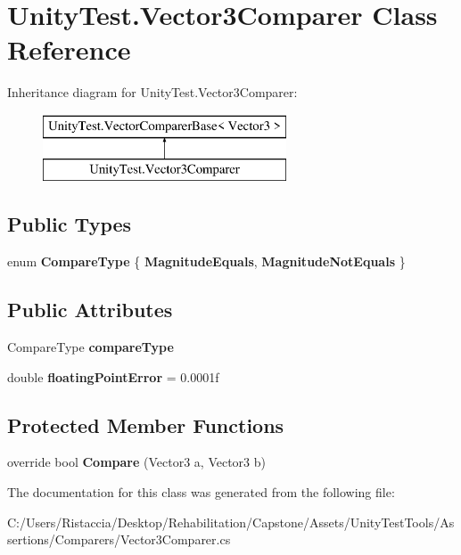 \hypertarget{class_unity_test_1_1_vector3_comparer}{}\section{Unity\+Test.\+Vector3\+Comparer Class Reference}
\label{class_unity_test_1_1_vector3_comparer}
Inheritance diagram for Unity\+Test.\+Vector3\+Comparer\+:\begin{figure}[H]
\begin{center}
\leavevmode
\includegraphics[height=2.000000cm]{class_unity_test_1_1_vector3_comparer}
\end{center}
\end{figure}
\subsection*{Public Types}
\begin{DoxyCompactItemize}
\item 
\mbox{\label{class_unity_test_1_1_vector3_comparer_aa809eae790a778d5ecda0938a08ebe15}} 
enum {\bfseries Compare\+Type} \{ {\bfseries Magnitude\+Equals}, 
{\bfseries Magnitude\+Not\+Equals}
 \}
\end{DoxyCompactItemize}
\subsection*{Public Attributes}
\begin{DoxyCompactItemize}
\item 
\mbox{\label{class_unity_test_1_1_vector3_comparer_ae949ea6de5f9a44e9a883465fc8ea43a}} 
Compare\+Type {\bfseries compare\+Type}
\item 
\mbox{\label{class_unity_test_1_1_vector3_comparer_a9e22fbd111297d9b3fdbd504d55b3c4f}} 
double {\bfseries floating\+Point\+Error} = 0.\+0001f
\end{DoxyCompactItemize}
\subsection*{Protected Member Functions}
\begin{DoxyCompactItemize}
\item 
\mbox{\label{class_unity_test_1_1_vector3_comparer_a079ced80d78803266d5add2fdad11ff1}} 
override bool {\bfseries Compare} (Vector3 a, Vector3 b)
\end{DoxyCompactItemize}


The documentation for this class was generated from the following file\+:\begin{DoxyCompactItemize}
\item 
C\+:/\+Users/\+Ristaccia/\+Desktop/\+Rehabilitation/\+Capstone/\+Assets/\+Unity\+Test\+Tools/\+Assertions/\+Comparers/Vector3\+Comparer.\+cs\end{DoxyCompactItemize}
